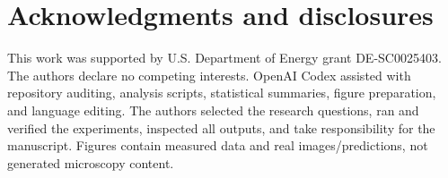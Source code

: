 \documentclass{article}
\begin{document}
\section{Acknowledgments and disclosures}
This work was supported by U.S. Department of Energy grant DE-SC0025403. The authors declare no competing interests. OpenAI Codex assisted with repository auditing, analysis scripts, statistical summaries, figure preparation, and language editing. The authors selected the research questions, ran and verified the experiments, inspected all outputs, and take responsibility for the manuscript. Figures contain measured data and real images/predictions, not generated microscopy content.



\end{document}
